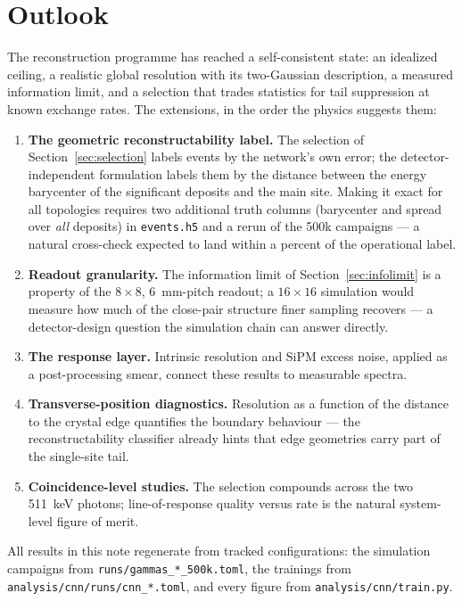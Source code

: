 \documentclass[11pt,a4paper]{article}
\newcommand{\code}[1]{\texttt{#1}}
\begin{document}
\section{Outlook}

The reconstruction programme has reached a self-consistent state: an
idealized ceiling, a realistic global resolution with its two-Gaussian
description, a measured information limit, and a selection that trades
statistics for tail suppression at known exchange rates. The extensions, in
the order the physics suggests them:

\begin{enumerate}
  \item \textbf{The geometric reconstructability label.} The selection of
    Section~\ref{sec:selection} labels events by the network's own error; the
    detector-independent formulation labels them by the distance between the
    energy barycenter of the significant deposits and the main site. Making
    it exact for all topologies requires two additional truth columns
    (barycenter and spread over \emph{all} deposits) in \code{events.h5} and
    a rerun of the 500k campaigns --- a natural cross-check expected to land
    within a percent of the operational label.
  \item \textbf{Readout granularity.} The information limit of
    Section~\ref{sec:infolimit} is a property of the $8\times8$, 6~mm-pitch
    readout; a $16\times16$ simulation would measure how much of the close-pair
    structure finer sampling recovers --- a detector-design question the
    simulation chain can answer directly.
  \item \textbf{The response layer.} Intrinsic resolution and SiPM excess
    noise, applied as a post-processing smear, connect these results to
    measurable spectra.
  \item \textbf{Transverse-position diagnostics.} Resolution as a function of
    the distance to the crystal edge quantifies the boundary behaviour ---
    the reconstructability classifier already hints that edge geometries
    carry part of the single-site tail.
  \item \textbf{Coincidence-level studies.} The selection compounds across
    the two 511~keV photons; line-of-response quality versus rate is the
    natural system-level figure of merit.
\end{enumerate}

All results in this note regenerate from tracked configurations: the
simulation campaigns from \code{runs/gammas\_*\_500k.toml}, the trainings from
\code{analysis/cnn/runs/cnn\_*.toml}, and every figure from
\code{analysis/cnn/train.py}.
\end{document}
